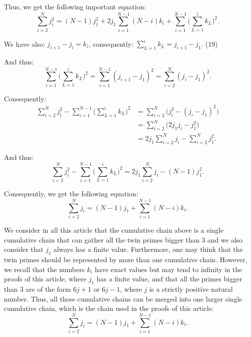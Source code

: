 \documentclass[11pt]{article}
\begin{document}
Thus, we get the following important equation:
\begin{equation}
\sum_{i=2}^{N} j_i^2 = (N-1)j_1^2 + 2j_1\sum_{i=1}^{N-1}(N-i)k_i + \sum_{i=1}^{N-1}\Big(\sum_{L=1}^{i}k_L\Big)^2.
\end{equation}

We have also: $j_{i+1}-j_i = k_i$, consequently: $\sum_{L=1}^{i} k_L = j_{i+1} - j_1$. \hfill (19)

And thus:
\begin{equation}
\sum_{i=1}^{N-1}\Big(\sum_{L=1}^{i}k_L\Big)^2 = \sum_{i=1}^{N-1}(j_{i+1}-j_1)^2 = \sum_{i=2}^{N}(j_i-j_1)^2.
\end{equation}

Consequently:
\begin{equation}
\begin{aligned}\sum_{i=2}^{N} j_i^2 - \sum_{i=1}^{N-1}\Big(\sum_{L=1}^{i}k_L\Big)^2 &= \sum_{i=2}^{N}\big(j_i^2-(j_i-j_1)^2\big) \\ &= \sum_{i=2}^{N}\big(2j_1 j_i - j_1^2\big) \\ &= 2j_1\sum_{i=2}^{N} j_i - \sum_{i=2}^{N} j_1^2.\end{aligned}
\end{equation}

And thus:
\begin{equation}
\sum_{i=2}^{N} j_i^2 - \sum_{i=1}^{N-1}\Big(\sum_{L=1}^{i}k_L\Big)^2 = 2j_1\sum_{i=2}^{N} j_i - (N-1)j_1^2.
\end{equation}

Consequently, we get the following equation:
\begin{equation}
\sum_{i=2}^{N} j_i = (N-1)j_1 + \sum_{i=1}^{N-1}(N-i)k_i.
\end{equation}

We consider in all this article that the cumulative chain above is a single cumulative chain that can gather all the twin primes bigger than $3$ and we also consider that $j_1$ always has a finite value. Furthermore, one may think that the twin primes should be represented by more than one cumulative chain. However, we recall that the numbers $k_i$ have exact values but may tend to infinity in the proofs of this article, where $j_1$ has a finite value, and that all the primes bigger than $3$ are of the form $6j+1$ or $6j-1$, where $j$ is a strictly positive natural number. Thus, all these cumulative chains can be merged into one larger single cumulative chain, which is the chain used in the proofs of this article:
\begin{equation}
\sum_{i=2}^{N} j_i = (N-1)j_1 + \sum_{i=1}^{N-1}(N-i)k_i.
\end{equation}
\end{document}
